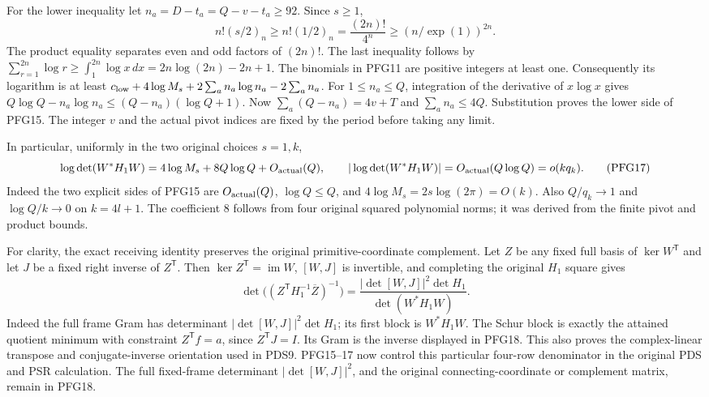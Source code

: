 \documentclass[10pt]{article}
\begin{document}
For the lower inequality let $n_a=D-t_a=Q-v-t_a\ge92$.
Since $s\ge1$,
\[
 n!(s/2)_n\ge n!(1/2)_n
       =\frac{(2n)!}{4^n}
       \ge(n/\exp(1))^{2n}.
 \tag{PFG16}
\]
The product equality separates even and odd factors of $(2n)!$.
The last inequality follows by
$\sum_{r=1}^{2n}\log r\ge
\int_1^{2n}\log x\,dx=2n\log(2n)-2n+1$.
The binomials in PFG11 are positive integers at least one.
Consequently its logarithm is at least
$c_{\rm low}+4\log M_s+2\sum_a n_a\log n_a-2\sum_a n_a$.
For $1\le n_a\le Q$, integration of the derivative of $x\log x$
gives
$Q\log Q-n_a\log n_a\le(Q-n_a)(\log Q+1)$.
Now $\sum_a(Q-n_a)=4v+T$ and $\sum_a n_a\le4Q$.
Substitution proves the lower side of PFG15. The integer $v$ and
the actual pivot indices are fixed by the period before taking
any limit.

In particular, uniformly in the two original choices $s=1,k$,
\[
 \log\det(W^*H_1W)=4\log M_s+8Q\log Q+O_{\rm actual}(Q),
 \qquad
 |\log\det(W^*H_1W)|=O_{\rm actual}(Q\log Q)=o(kq_k).
 \tag{PFG17}
\]
Indeed the two explicit sides of PFG15 are $O_{\rm actual}(Q)$,
$\log Q\le Q$, and $4\log M_s=2s\log(2\pi)=O(k)$.
Also $Q/q_k\to1$ and $\log Q/k\to0$ on $k=4l+1$.
The coefficient $8$ follows from four original squared polynomial
norms; it was derived from the finite pivot and product bounds.

For clarity, the exact receiving identity preserves the original
primitive-coordinate complement. Let $Z$ be any fixed full basis
of $\ker W^{\mathsf T}$ and let $J$ be a fixed right inverse of
$Z^{\mathsf T}$. Then $\ker Z^{\mathsf T}=\operatorname{im}W$,
$[W,J]$ is invertible, and completing the original $H_1$ square gives
\[
 \det\bigl((Z^{\mathsf T}H_1^{-1}\overline Z)^{-1}\bigr)
      =\frac{|\det[W,J]|^2\det H_1}{\det(W^*H_1W)} .
 \tag{PFG18}
\]
Indeed the full frame Gram has determinant
$|\det[W,J]|^2\det H_1$; its first block is $W^*H_1W$.
The Schur block is exactly the attained quotient minimum with
constraint $Z^{\mathsf T}f=a$, since $Z^{\mathsf T}J=I$.
Its Gram is the inverse displayed in PFG18. This also proves
the complex-linear transpose and conjugate-inverse orientation
used in PDS9. PFG15--17 now control this particular four-row
denominator in the original PDS and PSR calculation. The full
fixed-frame determinant $|\det[W,J]|^2$, and the original
connecting-coordinate or complement matrix, remain in PFG18.



\end{document}
